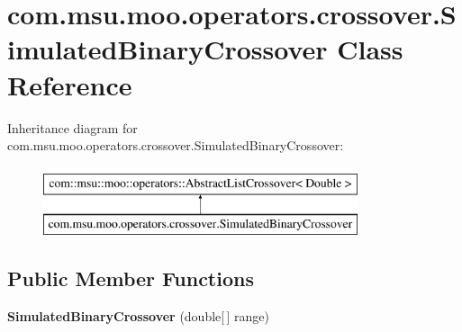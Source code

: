 \hypertarget{classcom_1_1msu_1_1moo_1_1operators_1_1crossover_1_1SimulatedBinaryCrossover}{\section{com.\-msu.\-moo.\-operators.\-crossover.\-Simulated\-Binary\-Crossover Class Reference}
\label{classcom_1_1msu_1_1moo_1_1operators_1_1crossover_1_1SimulatedBinaryCrossover}
}
Inheritance diagram for com.\-msu.\-moo.\-operators.\-crossover.\-Simulated\-Binary\-Crossover\-:\begin{figure}[H]
\begin{center}
\leavevmode
\includegraphics[height=2.000000cm]{classcom_1_1msu_1_1moo_1_1operators_1_1crossover_1_1SimulatedBinaryCrossover}
\end{center}
\end{figure}
\subsection*{Public Member Functions}
\begin{DoxyCompactItemize}
\item 
\hypertarget{classcom_1_1msu_1_1moo_1_1operators_1_1crossover_1_1SimulatedBinaryCrossover_ac53a622aa37bb4b1f600c48c5dec2b1c}{{\bfseries Simulated\-Binary\-Crossover} (double\mbox{[}$\,$\mbox{]} range)}\label{classcom_1_1msu_1_1moo_1_1operators_1_1crossover_1_1SimulatedBinaryCrossover_ac53a622aa37bb4b1f600c48c5dec2b1c}

\end{DoxyCompactItemize}
